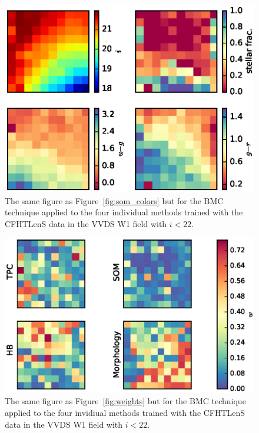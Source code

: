 \documentclass[useAMS,usenatbib]{mn2e}
\begin{document}



\begin{figure}
  \includegraphics[width=\linewidth]{figures/som_colors_cut.eps}
  \caption{The same figure as Figure~\ref{fig:som_colors}
      but for the BMC technique applied to the four individual methods
      trained with the CFHTLenS data in the VVDS W1 field
      with $i < 22$.}
  \label{fig:som_colors_cut}
\end{figure}

\begin{figure}
  \includegraphics[width=\linewidth]{figures/weights_cut.eps}
  \caption{The same figure as Figure~\ref{fig:weights}
      but for the BMC technique applied to the four invidiual methods
      trained with the CFHTLenS data in the VVDS W1 field
      with $i < 22$.}
  \label{fig:weights_cut}
\end{figure}
\end{document}
